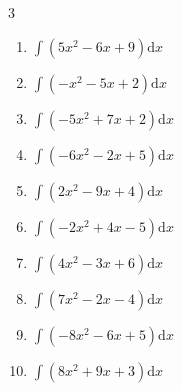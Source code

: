 \begin{multicols}{3}
\begin{enumerate}
  \item $\displaystyle \int \left( 5x^{2}-6x+9 \right) \mathrm{d}x$


  \item $\displaystyle \int \left( -x^{2}-5x+2 \right) \mathrm{d}x$


  \item $\displaystyle \int \left( -5x^{2}+7x+2 \right) \mathrm{d}x$


  \item $\displaystyle \int \left( -6x^{2}-2x+5 \right) \mathrm{d}x$


  \item $\displaystyle \int \left( 2x^{2}-9x+4 \right) \mathrm{d}x$


  \item $\displaystyle \int \left( -2x^{2}+4x-5 \right) \mathrm{d}x$


  \item $\displaystyle \int \left( 4x^{2}-3x+6 \right) \mathrm{d}x$


  \item $\displaystyle \int \left( 7x^{2}-2x-4 \right) \mathrm{d}x$


  \item $\displaystyle \int \left( -8x^{2}-6x+5 \right) \mathrm{d}x$


  \item $\displaystyle \int \left( 8x^{2}+9x+3 \right) \mathrm{d}x$


\columnbreak %


\end{enumerate}
\end{multicols}
